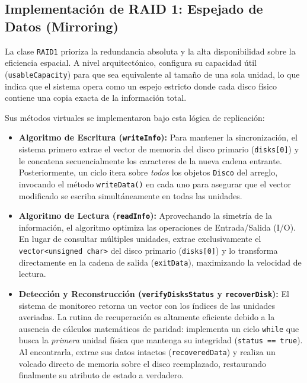 \documentclass[12pt, a4paper]{article}
\begin{document}
\subsection{Implementación de RAID 1: Espejado de Datos (Mirroring)}

La clase \texttt{RAID1} prioriza la redundancia absoluta y la alta disponibilidad sobre la eficiencia espacial. A nivel arquitectónico, configura su capacidad útil (\texttt{usableCapacity}) para que sea equivalente al tamaño de una sola unidad, lo que indica que el sistema opera como un espejo estricto donde cada disco físico contiene una copia exacta de la información total.

Sus métodos virtuales se implementaron bajo esta lógica de replicación:

\begin{itemize}
    \item \textbf{Algoritmo de Escritura (\texttt{writeInfo}):} Para mantener la sincronización, el sistema primero extrae el vector de memoria del disco primario (\texttt{disks[0]}) y le concatena secuencialmente los caracteres de la nueva cadena entrante. Posteriormente, un ciclo itera sobre \textit{todos} los objetos \texttt{Disco} del arreglo, invocando el método \texttt{writeData()} en cada uno para asegurar que el vector modificado se escriba simultáneamente en todas las unidades.
    
    \item \textbf{Algoritmo de Lectura (\texttt{readInfo}):} Aprovechando la simetría de la información, el algoritmo optimiza las operaciones de Entrada/Salida (I/O). En lugar de consultar múltiples unidades, extrae exclusivamente el \texttt{vector<unsigned char>} del disco primario (\texttt{disks[0]}) y lo transforma directamente en la cadena de salida (\texttt{exitData}), maximizando la velocidad de lectura.
    
    \item \textbf{Detección y Reconstrucción (\texttt{verifyDisksStatus} y \texttt{recoverDisk}):} El sistema de monitoreo retorna un vector con los índices de las unidades averiadas. La rutina de recuperación es altamente eficiente debido a la ausencia de cálculos matemáticos de paridad: implementa un ciclo \texttt{while} que busca la \textit{primera} unidad física que mantenga su integridad (\texttt{status == true}). Al encontrarla, extrae sus datos intactos (\texttt{recoveredData}) y realiza un volcado directo de memoria sobre el disco reemplazado, restaurando finalmente su atributo de estado a verdadero.
\end{itemize}
\end{document}
